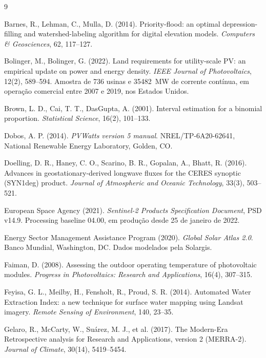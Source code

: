 \documentclass[11pt,a4paper,oneside]{book}
\begin{document}
\begin{thebibliography}{9}

Barnes, R., Lehman, C., Mulla, D. (2014). Priority-flood: an optimal
depression-filling and watershed-labeling algorithm for digital elevation
models. \emph{Computers \& Geosciences}, 62, 117--127.

Bolinger, M., Bolinger, G. (2022). Land requirements for utility-scale PV: an
empirical update on power and energy density. \emph{IEEE Journal of
Photovoltaics}, 12(2), 589--594. Amostra de 736 usinas e
\qty{35482}{\mega\watt} de corrente contínua, em operação comercial entre 2007
e 2019, nos Estados Unidos.

Brown, L. D., Cai, T. T., DasGupta, A. (2001). Interval estimation for a
binomial proportion. \emph{Statistical Science}, 16(2), 101--133.

Dobos, A. P. (2014). \emph{PVWatts version 5 manual}. NREL/TP-6A20-62641,
National Renewable Energy Laboratory, Golden, CO.

Doelling, D. R., Haney, C. O., Scarino, B. R., Gopalan, A., Bhatt, R. (2016).
Advances in geostationary-derived longwave fluxes for the CERES synoptic
(SYN1deg) product. \emph{Journal of Atmospheric and Oceanic Technology}, 33(3),
503--521.

European Space Agency (2021). \emph{Sentinel-2 Products Specification
Document}, PSD v14.9. Processing baseline 04.00, em produção desde 25 de
janeiro de 2022.

Energy Sector Management Assistance Program (2020). \emph{Global Solar Atlas
2.0}. Banco Mundial, Washington, DC. Dados modelados pela Solargis.

Faiman, D. (2008). Assessing the outdoor operating temperature of photovoltaic
modules. \emph{Progress in Photovoltaics: Research and Applications}, 16(4),
307--315.

Feyisa, G. L., Meilby, H., Fensholt, R., Proud, S. R. (2014). Automated Water
Extraction Index: a new technique for surface water mapping using Landsat
imagery. \emph{Remote Sensing of Environment}, 140, 23--35.

Gelaro, R., McCarty, W., Suárez, M. J., et al. (2017). The Modern-Era
Retrospective analysis for Research and Applications, version 2 (MERRA-2).
\emph{Journal of Climate}, 30(14), 5419--5454.


\end{thebibliography}
\end{document}
